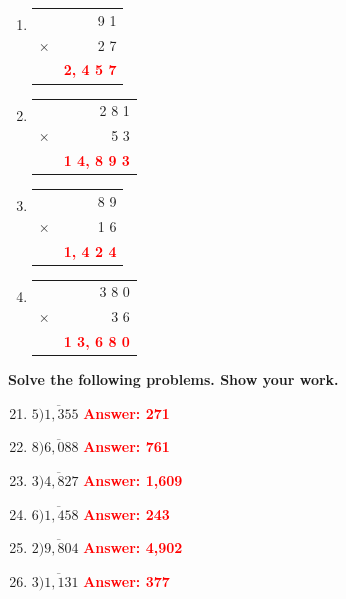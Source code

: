\documentclass[11pt, a4paper]{article}
\newcommand{\answerline}[1]{\textcolor{red}{\textbf{#1}}}
\begin{document}
\begin{enumerate}[label=\arabic*.]
    \vspace{1.5cm}
    \setcounter{enumi}{13}
    \item \begin{tabular}[t]{c r}
          & 9 1 \\
        $\times$ & 2 7 \\ \hline
          & \answerline{2, 4 5 7} \\ \hline
    \end{tabular}
    \hfill
    \setcounter{enumi}{18}
    \item \begin{tabular}[t]{c r}
          & 2 8 1 \\
        $\times$ & 5 3 \\ \hline
          & \answerline{1 4, 8 9 3} \\ \hline
    \end{tabular}

    \vspace{1.5cm}
    \setcounter{enumi}{14}
    \item \begin{tabular}[t]{c r}
          & 8 9 \\
        $\times$ & 1 6 \\ \hline
          & \answerline{1, 4 2 4} \\ \hline
    \end{tabular}
    \hfill
    \setcounter{enumi}{19}
    \item \begin{tabular}[t]{c r}
          & 3 8 0 \\
        $\times$ & 3 6 \\ \hline
          & \answerline{1 3, 6 8 0} \\ \hline
    \end{tabular}
\end{enumerate}

\pagebreak

\textbf{Solve the following problems. Show your work.}

\begin{enumerate}[label=\arabic*.]
    \setcounter{enumi}{20}
    \item $5 \overline{) 1, 3 5 5}$ \quad \answerline{Answer: 271}
    \hfill
    \setcounter{enumi}{23}
    \item $8 \overline{) 6, 0 8 8}$ \quad \answerline{Answer: 761}

    \vspace{2cm}
    \setcounter{enumi}{21}
    \item $3 \overline{) 4, 8 2 7}$ \quad \answerline{Answer: 1,609}
    \hfill
    \setcounter{enumi}{24}
    \item $6 \overline{) 1, 4 5 8}$ \quad \answerline{Answer: 243}

    \vspace{2cm}
    \setcounter{enumi}{22}
    \item $2 \overline{) 9, 8 0 4}$ \quad \answerline{Answer: 4,902}
    \hfill
    \setcounter{enumi}{25}
    \item $3 \overline{) 1, 1 3 1}$ \quad \answerline{Answer: 377}
\end{enumerate}
\end{document}
